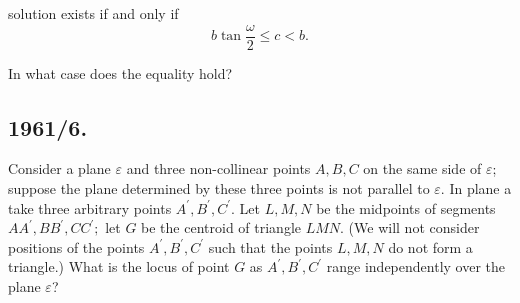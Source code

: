 \documentclass[12pt,thmsa]{article}
\begin{document}
solution exists if and only if
\[
b\tan \frac{\omega }{2}\leq c<b.
\]

In what case does the equality hold?

\subsection{1961/6.}

Consider a plane $\varepsilon $ and three non-collinear points $A,B,C$ on
the same side of $\varepsilon $; suppose the plane determined by these three
points is not parallel to $\varepsilon $. In plane a take three arbitrary
points $A^{\prime },B^{\prime },C^{\prime }.$ Let $L,M,N$ be the midpoints
of segments $AA^{\prime },BB^{\prime },CC^{\prime };$ let $G$ be the
centroid of triangle $LMN.$ (We will not consider positions of the points $%
A^{\prime },B^{\prime },C^{\prime }$ such that the points $L,M,N$ do not
form a triangle.) What is the locus of point $G$ as $A^{\prime },B^{\prime
},C^{\prime }$ range independently over the plane $\varepsilon $?
\end{document}
